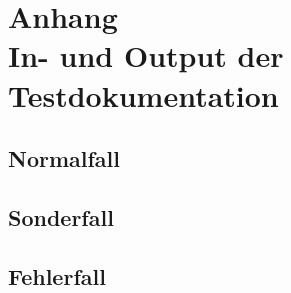 \addtocounter{chapter}{1}
\chapter*{Anhang \thechapter\\[1.2cm] In- und Output der Testdokumentation}
\label{InOutput}

\section*{Normalfall}

\section*{Sonderfall}

\section*{Fehlerfall}

\cleardoublepage